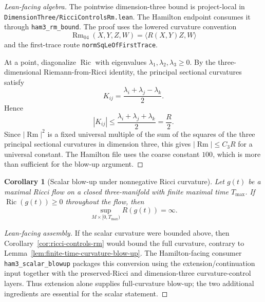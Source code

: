 \documentclass[11pt]{article}
\theoremstyle{plain}
\newtheorem{corollary}[theorem]{Corollary}
\theoremstyle{definition}
\theoremstyle{remark}
\newcommand{\Ric}{\operatorname{Ric}}
\newcommand{\Rm}{\operatorname{Rm}}
\newcommand{\abs}[1]{\left|#1\right|}
\newcommand{\norm}[1]{\left|#1\right|}
\newcommand{\leanref}[1]{\nolinkurl{#1}}
\newcommand{\leanfile}[1]{\nolinkurl{#1}}
\newcommand{\rffile}[1]{\leanfile{#1}}
\begin{document}
\begin{proof}[Lean-facing algebra]
The pointwise dimension-three bound is project-local in
\rffile{DimensionThree/RicciControlsRm.lean}.  The Hamilton endpoint consumes
it through \leanref{ham3_rm_bound}.  The proof uses the lowered curvature
convention
\[
  \Rm_{04}(X,Y,Z,W)=\langle R(X,Y)Z,W\rangle
\]
and the first-trace route \leanref{normSqLeOfFirstTrace}.

At a point, diagonalize \(\Ric\) with eigenvalues
\(\lambda_1,\lambda_2,\lambda_3\ge0\).  By the three-dimensional
Riemann-from-Ricci identity, the principal sectional curvatures satisfy
\[
K_{ij}=\frac{\lambda_i+\lambda_j-\lambda_k}{2}.
\]
Hence
\[
\abs{K_{ij}}\le\frac{\lambda_i+\lambda_j+\lambda_k}{2}=\frac R2.
\]
Since \(\norm{\Rm}^2\) is a fixed universal multiple of the sum of the squares
of the three principal sectional curvatures in dimension three, this gives
\(\norm{\Rm}\le C_3R\) for a universal constant.  The Hamilton file uses the
coarse constant \(100\), which is more than sufficient for the blow-up
argument.
\end{proof}

\begin{corollary}[Scalar blow-up under nonnegative Ricci curvature]
\label{cor:finite-time-scalar-blow-up}
Let $g(t)$ be a maximal Ricci flow on a closed three-manifold with finite
maximal time $T_{\max}$.  If $\Ric(g(t))\ge0$ throughout the flow, then
\[
  \sup_{M\times[0,T_{\max})} R(g(t))=\infty.
\]
\end{corollary}

\begin{proof}[Lean-facing assembly]
If the scalar curvature were bounded above, then
Corollary~\ref{cor:ricci-controls-rm} would bound the full curvature, contrary
to Lemma~\ref{lem:finite-time-curvature-blow-up}.  The Hamilton-facing
consumer \leanref{ham3_scalar_blowup} packages this conversion using the
extension/continuation input together with the preserved-Ricci and
dimension-three curvature-control layers.  Thus extension alone supplies
full-curvature blow-up; the two additional ingredients are essential for the
scalar statement.
\end{proof}
\end{document}
